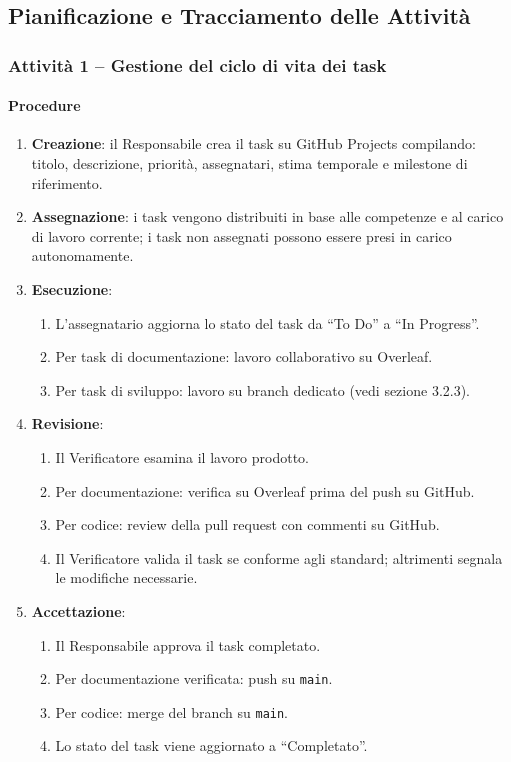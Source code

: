 \documentclass[a4paper, 11pt, oneside]{scrartcl}
\begin{document}
\subsection{Pianificazione e Tracciamento delle Attività}

\subsubsection{Attività 1 – Gestione del ciclo di vita dei task}

\paragraph{Procedure}
\begin{enumerate}
    \item \textbf{Creazione}: il Responsabile crea il task su GitHub Projects compilando: titolo, descrizione, priorità, assegnatari, stima temporale e milestone{\scriptsize{}} di riferimento.
    \item \textbf{Assegnazione}: i task vengono distribuiti in base alle competenze e al carico di lavoro corrente; i task non assegnati possono essere presi in carico autonomamente.
    \item \textbf{Esecuzione}:
          \begin{enumerate}[label=\alph*.]
              \item L'assegnatario aggiorna lo stato del task da ``To Do'' a ``In Progress''.
              \item Per task di documentazione: lavoro collaborativo su Overleaf.
              \item Per task di sviluppo: lavoro su branch dedicato (vedi sezione 3.2.3).
          \end{enumerate}
    \item \textbf{Revisione}:
          \begin{enumerate}[label=\alph*.]
              \item Il Verificatore esamina il lavoro prodotto.
              \item Per documentazione: verifica su Overleaf prima del push su GitHub.
              \item Per codice: review della pull request con commenti su GitHub.
              \item Il Verificatore valida il task se conforme agli standard; altrimenti segnala le modifiche necessarie.
          \end{enumerate}
    \item \textbf{Accettazione}:
          \begin{enumerate}[label=\alph*.]
              \item Il Responsabile approva il task completato.
              \item Per documentazione verificata: push su \texttt{main}.
              \item Per codice: merge del branch su \texttt{main}.
              \item Lo stato del task viene aggiornato a ``Completato''.
          \end{enumerate}
\end{enumerate}
\end{document}
